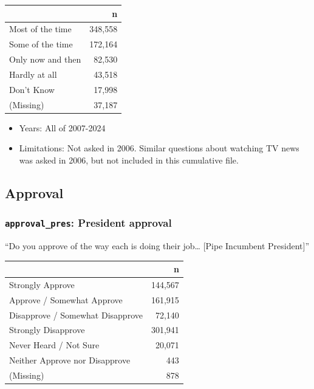 \documentclass[10pt,article,oneside]{memoir}
\begin{document}
\begin{table}[H]
\centering
\begin{tabular}[t]{lr}
\toprule
 & n\\
\midrule
Most of the time & 348,558\\
Some of the time & 172,164\\
Only now and then & 82,530\\
Hardly at all & 43,518\\
Don't Know & 17,998\\
(Missing) & 37,187\\
\bottomrule
\end{tabular}
\end{table}

\begin{itemize}
\tightlist
\item
  Years: All of 2007-2024
\item
  Limitations: Not asked in 2006. Similar questions about watching TV
  news was asked in 2006, but not included in this cumulative file.
\end{itemize}

\subsection{Approval}\label{approval}

\subsubsection{\texorpdfstring{\texttt{approval\_pres}: President
approval}{approval\_pres: President approval}}\label{approval_pres-president-approval}

``Do you approve of the way each is doing their job\ldots{} {[}Pipe
Incumbent President{]}''

\begin{table}[H]
\centering
\begin{tabular}[t]{lr}
\toprule
 & n\\
\midrule
Strongly Approve & 144,567\\
Approve / Somewhat Approve & 161,915\\
Disapprove / Somewhat Disapprove & 72,140\\
Strongly Disapprove & 301,941\\
Never Heard / Not Sure & 20,071\\
Neither Approve nor Disapprove & 443\\
(Missing) & 878\\
\bottomrule
\end{tabular}
\end{table}
\end{document}
